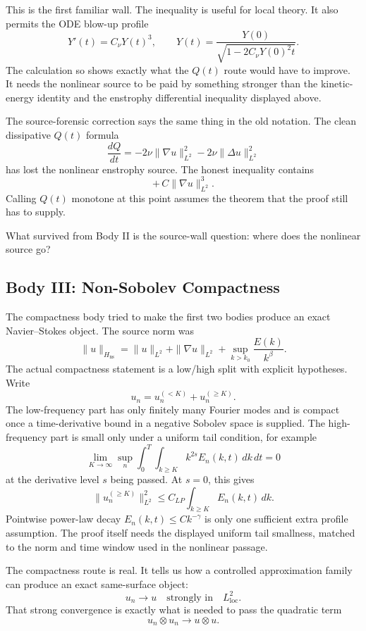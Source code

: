 This is the first familiar wall.
The inequality is useful for local theory.
It also permits the ODE blow-up profile
\[
  Y'(t)=C_\nu Y(t)^3,
  \qquad
  Y(t)
  =
  \frac{Y(0)}{\sqrt{1-2C_\nu Y(0)^2t}} .
\]
The calculation so shows exactly what the \(Q(t)\) route would have to
improve.
It needs the nonlinear source to be paid by something stronger than the
kinetic-energy identity and the enstrophy differential inequality displayed
above.

The source-forensic correction says the same thing in the old notation.
The clean dissipative \(Q(t)\) formula
\[
  \frac{dQ}{dt}
  =
  -2\nu\|\nabla u\|_{L^2}^2
  -2\nu\|\Delta u\|_{L^2}^2
\]
has lost the nonlinear enstrophy source.
The honest inequality contains
\[
  +\,C\|\nabla u\|_{L^2}^3 .
\]
Calling \(Q(t)\) monotone at this point assumes the theorem that the proof still
has to supply.

What survived from Body II is the source-wall question:
where does the nonlinear source go?

\subsection{Body III: Non-Sobolev Compactness}

The compactness body tried to make the first two bodies produce an exact
Navier--Stokes object.
The source norm was
\[
  \|u\|_{H_{\mathrm{ns}}}
  =
  \|u\|_{L^2}
  +\|\nabla u\|_{L^2}
  +\sup_{k>k_0}\frac{E(k)}{k^\beta}.
\]
The actual compactness statement is a low/high split with explicit hypotheses.
Write
\[
  u_n=u_n^{(<K)}+u_n^{(\ge K)} .
\]
The low-frequency part has only finitely many Fourier modes and is compact once
a time-derivative bound in a negative Sobolev space is supplied.  The
high-frequency part is small only under a uniform tail condition, for example
\[
  \lim_{K\to\infty}
  \sup_n\int_0^T
  \int_{k\ge K} k^{2s}E_n(k,t)\,dk\,dt
  =0
\]
at the derivative level \(s\) being passed.  At \(s=0\), this gives
\[
  \|u_n^{(\ge K)}\|_{L^2}^2
  \le C_{LP}
  \int_{k\ge K}E_n(k,t)\,dk .
\]
Pointwise power-law decay \(E_n(k,t)\le Ck^{-\gamma}\) is only one sufficient
extra profile assumption.  The proof itself needs the displayed uniform tail
smallness, matched to the norm and time window used in the nonlinear passage.

The compactness route is real.
It tells us how a controlled approximation family can produce an exact
same-surface object:
\[
  u_n\to u
  \quad\text{strongly in}\quad
  L^2_{\mathrm{loc}} .
\]
That strong convergence is exactly what is needed to pass the quadratic term
\[
  u_n\otimes u_n \to u\otimes u .
\]

